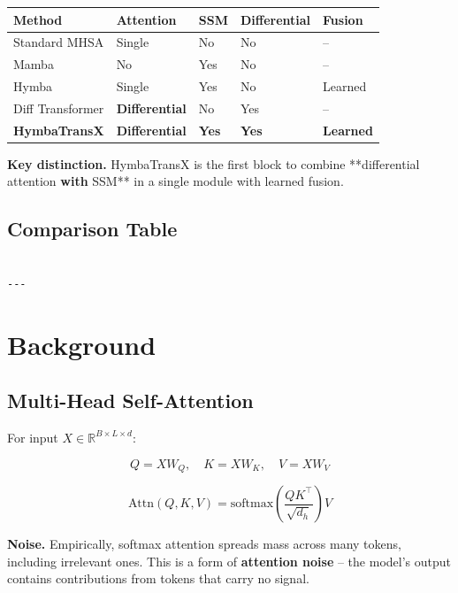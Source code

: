 \begin{table}[H]
\centering
\small
\begin{tabular}{lllll}
\toprule
\textbf{Method} & \textbf{Attention} & \textbf{SSM} & \textbf{Differential} & \textbf{Fusion} \\
\midrule
Standard MHSA & Single & No & No & -- \\
Mamba & No & Yes & No & -- \\
Hymba & Single & Yes & No & Learned \\
Diff Transformer & \textbf{Differential} & No & Yes & -- \\
\textbf{HymbaTransX} & \textbf{Differential} & \textbf{Yes} & \textbf{Yes} & \textbf{Learned} \\
\bottomrule
\end{tabular}
\end{table}

\textbf{Key distinction.} HymbaTransX is the first block to combine **differential 
attention\textbf{ with }SSM** in a single module with learned fusion.



\subsection{Comparison Table}

\begin{lstlisting}

---
\end{lstlisting}

\section{Background}

\subsection{Multi-Head Self-Attention}

For input $X \in \mathbb{R}^{B \times L \times d}$:

\[
Q = X W_Q, \quad K = X W_K, \quad V = X W_V
\tag{3.1}
\]

\[
\text{Attn}(Q, K, V) = \text{softmax}\!\left(\frac{Q K^\top}{\sqrt{d_h}}\right) V
\tag{3.2}
\]

\textbf{Noise.} Empirically, softmax attention spreads mass across many tokens, 
including irrelevant ones. This is a form of \textbf{attention noise} -- the 
model's output contains contributions from tokens that carry no signal.

